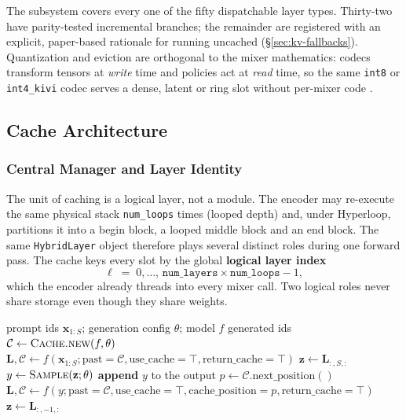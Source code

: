 The subsystem covers every one of the fifty dispatchable layer types. Thirty-two have parity-tested incremental branches; the remainder are registered with an explicit, paper-based rationale for running uncached (\S\ref{sec:kv-fallbacks}). Quantization and eviction are orthogonal to the mixer mathematics: codecs transform tensors at \emph{write} time and policies act at \emph{read} time, so the same \texttt{int8} or \texttt{int4\_kivi} codec serves a dense, latent or ring slot without per-mixer code \citep{kivi_liu_2024,kvquant_hooper_2024,skvq_duanmu_2024}.

\subsection{Cache Architecture}
\label{sec:kv-architecture}

\subsubsection{Central Manager and Layer Identity}

The unit of caching is a logical layer, not a module. The encoder may re-execute the same physical stack \texttt{num\_loops} times (looped depth) and, under Hyperloop, partitions it into a begin block, a looped middle block and an end block. The same \texttt{HybridLayer} object therefore plays several distinct roles during one forward pass. The cache keys every slot by the global \textbf{logical layer index}
\[
\ell \;=\; 0,\dots,\, \texttt{num\_layers}\times\texttt{num\_loops}-1 ,
\]
which the encoder already threads into every mixer call. Two logical roles never share storage even though they share weights.

\begin{algorithm}[H]
\caption{Cached generation loop (prefill + decode)}
\begin{algorithmic}[1]
\Require prompt ids $\mathbf{x}_{1:S}$; generation config $\theta$; model $f$
\Ensure generated ids
\State $\mathcal{C} \gets \textsc{Cache.new}(f,\theta)$ 
\State $\mathbf{L}, \mathcal{C} \gets f(\mathbf{x}_{1:S}; \text{past}=\mathcal{C}, \text{use\_cache}=\top, \text{return\_cache}=\top)$ 
\State $\mathbf{z} \gets \mathbf{L}_{:,S,:}$
    \State $y \gets \textsc{Sample}(\mathbf{z};\theta)$ 
    \State \textbf{append} $y$ to the output
        \State $p \gets \mathcal{C}.\text{next\_position}()$
        \State $\mathbf{L}, \mathcal{C} \gets f(y; \text{past}=\mathcal{C}, \text{use\_cache}=\top, \text{cache\_position}=p, \text{return\_cache}=\top)$
        \State $\mathbf{z} \gets \mathbf{L}_{:,-1,:}$
    \EndIf
\EndFor
\end{algorithmic}
\end{algorithm}


